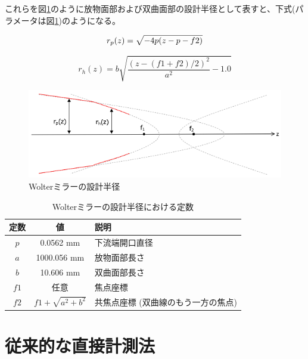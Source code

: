 \documentclass[dvipdfmx,autodetect-engine]{jreport}
\begin{document}
これらを図\ref{fig:wolter_profile}のように放物面部および双曲面部の設計半径として表すと、下式(パラメータは図\ref{tb:wolter_profile_constants})のようになる。

\begin{equation}
    r_p(z) = \sqrt{ -4p(z - p - f2) } \\
\end{equation}

\begin{equation}
    r_h(z) = b \sqrt{ \frac{(z - (f1 + f2) / 2)^2}{a^2} - 1.0 }
\end{equation}

\begin{figure}[h!]
\centering
\includegraphics[scale=0.55]{images/mirror_experiment/mirror_profile.png}
\caption{Wolterミラーの設計半径}
\label{fig:wolter_profile}
\end{figure}

\begin{table}[htb]
    \begin{center}
      \begin{tabular}{|c|c|l|} \hline
        定数 & 値 & 説明 \\ \hline
        $p$ & 0.0562 mm & 下流端開口直径 \\
        $a$ & 1000.056 mm & 放物面部長さ \\
        $b$ & 10.606 mm & 双曲面部長さ \\ 
        $f1$ & 任意 & 焦点座標 \\
        $f2$ & $f1 + \sqrt{ a^2 + b^2 }$  & 共焦点座標 (双曲線のもう一方の焦点) \\\hline
      \end{tabular}
      \label{tb:wolter_profile_constants}
      \caption{Wolterミラーの設計半径における定数}
    \end{center}
\end{table}

\section{従来的な直接計測法}
\end{document}
